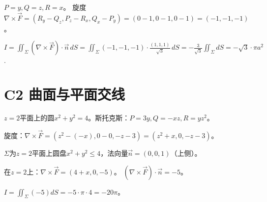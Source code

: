 \documentclass[12pt,a4paper]{ctexart}
\newcommand{\answerbox}[1]{\begin{center}\fbox{\color{red}\large\bfseries #1}\end{center}}
\begin{document}
$P=y,Q=z,R=x$。
旋度$\nabla\times\vec F = (R_y-Q_z,P_z-R_x,Q_x-P_y) = (0-1,0-1,0-1)=(-1,-1,-1)$。

$I=\iint_\Sigma(\nabla\times\vec F)\cdot\vec n\,dS
   =\iint_\Sigma(-1,-1,-1)\cdot\frac{(1,1,1)}{\sqrt3}\,dS
   =-\frac3{\sqrt3}\iint_\Sigma dS = -\sqrt3\cdot\pi a^2$.
\answerbox{$-\sqrt3\pi a^2$}

\section{C2 曲面与平面交线}


$z=2$平面上的圆$x^2+y^2=4$。斯托克斯：$P=3y,Q=-xz,R=yz^2$。

旋度：$\nabla\times\vec F = (z^2-(-x),0-0,-z-3) = (z^2+x,0,-z-3)$。

$\Sigma$为$z=2$平面上圆盘$x^2+y^2\le4$，法向量$\vec n=(0,0,1)$（上侧）。

在$z=2$上：$\nabla\times\vec F = (4+x,0,-5)$。
$(\nabla\times\vec F)\cdot\vec n = -5$。

$I=\iint_\Sigma(-5)dS=-5\cdot\pi\cdot4=-20\pi$。
\answerbox{$-20\pi$}
\end{document}

